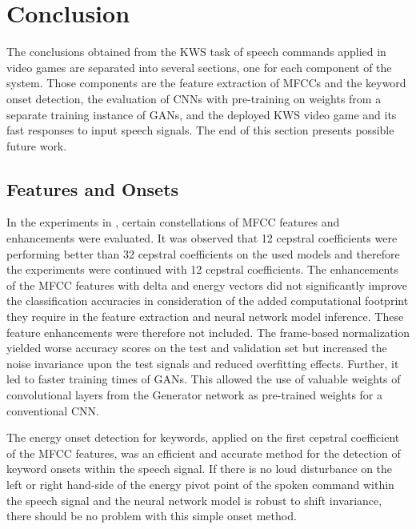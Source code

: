 
\chapter{Conclusion}\label{sec:conclusion}
The conclusions obtained from the KWS task of speech commands applied in video games are separated into several sections, one for each component of the system.
Those components are the feature extraction of MFCCs and the keyword onset detection, the evaluation of CNNs with pre-training on weights from a separate training instance of GANs, and the deployed KWS video game and its fast responses to input speech signals.
The end of this section presents possible future work.



\section{Features and Onsets}
In the experiments in , certain constellations of MFCC features and enhancements were evaluated.
It was observed that 12 cepstral coefficients were performing better than 32 cepstral coefficients on the used models and therefore the experiments were continued with 12 cepstral coefficients.
The enhancements of the MFCC features with delta and energy vectors did not significantly improve the classification accuracies in consideration of the added computational footprint they require in the feature extraction and neural network model inference. 
These feature enhancements were therefore not included.
The frame-based normalization yielded worse accuracy scores on the test and validation set but increased the noise invariance upon the test signals and reduced overfitting effects.
Further, it led to faster training times of GANs.
This allowed the use of valuable weights of convolutional layers from the Generator network as pre-trained weights for a conventional CNN.

The energy onset detection for keywords, applied on the first cepstral coefficient of the MFCC features, was an efficient and accurate method for the detection of keyword onsets within the speech signal.
If there is no loud disturbance on the left or right hand-side of the energy pivot point of the spoken command within the speech signal and the neural network model is robust to shift invariance, there should be no problem with this simple onset method.



